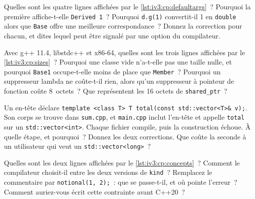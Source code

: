 \begin{question}\label{iq:iv3:cpp:34}
Quelles sont les quatre lignes affichées par le \cref{lst:iv3:cp:defaultargs}~? Pourquoi la première affiche-t-elle \texttt{Derived 1}~? Pourquoi \texttt{d.g(1)} convertit-il 1 en \texttt{double} alors que \texttt{Base} offre une meilleure correspondance~? Donnez la correction pour chacun, et dites lequel peut être signalé par une option du compilateur.
\label{lst:iv3:cp:defaultargs}
\end{question}

\begin{question}\label{iq:iv3:cpp:35}
Avec g++ 11.4, libstdc++ et x86-64, quelles sont les trois lignes affichées par le \cref{lst:iv3:cp:sizes}~? Pourquoi une classe vide n'a-t-elle pas une taille nulle, et pourquoi \texttt{Base1} occupe-t-elle moins de place que \texttt{Member}~? Pourquoi un suppresseur lambda ne coûte-t-il rien, alors qu'un suppresseur à pointeur de fonction coûte 8~octets~? Que représentent les 16 octets de \texttt{shared\_ptr}~?
\label{lst:iv3:cp:sizes}
\end{question}

\begin{question}\label{iq:iv3:cpp:36}
Un en-tête déclare \texttt{template <class T> T total(const std::vector<T>\& v);}. Son corps se trouve dans \texttt{sum.cpp}, et \texttt{main.cpp} inclut l'en-tête et appelle \texttt{total} sur un \texttt{std::vector<int>}. Chaque fichier compile, puis la construction échoue. À quelle étape, et pourquoi~? Donnez les deux corrections. Que coûte la seconde à un utilisateur qui veut un \texttt{std::vector<long>}~?
\end{question}

\begin{question}\label{iq:iv3:cpp:37}
Quelles sont les deux lignes affichées par le \cref{lst:iv3:cp:concepts}~? Comment le compilateur choisit-il entre les deux versions de \texttt{kind}~? Remplacez le commentaire par \texttt{notional(1, 2);}~: que se passe-t-il, et où pointe l'erreur~? Comment auriez-vous écrit cette contrainte avant C++20~?
\label{lst:iv3:cp:concepts}
\end{question}

